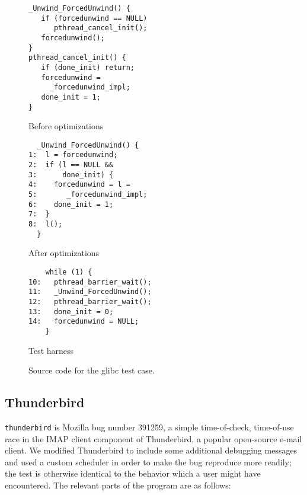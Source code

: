 \begin{figure*}
  \begin{subfloat}
    \begin{minipage}{52mm}
\begin{verbatim}
_Unwind_ForcedUnwind() {
   if (forcedunwind == NULL)
      pthread_cancel_init();
   forcedunwind();
}
pthread_cancel_init() {
   if (done_init) return;
   forcedunwind =
     _forcedunwind_impl;
   done_init = 1;
}
\end{verbatim}
    \end{minipage}
    \caption{Before optimizations}
  \end{subfloat}
  \begin{subfloat}
    \begin{minipage}{52mm}
\begin{verbatim}
  _Unwind_ForcedUnwind() {
1:  l = forcedunwind;
2:  if (l == NULL &&
3:      done_init) {
4:    forcedunwind = l =
5:       _forcedunwind_impl;
6:    done_init = 1;
7:  }
8:  l();
  }
\end{verbatim}
    \end{minipage}
    \caption{After optimizations}
  \end{subfloat}
  \begin{subfloat}
    \begin{minipage}{35mm}
\begin{verbatim}
    while (1) {
10:   pthread_barrier_wait();
11:   _Unwind_ForcedUnwind();
12:   pthread_barrier_wait();
13:   done_init = 0;
14:   forcedunwind = NULL;
    }
\end{verbatim}
    \end{minipage}
    \caption{Test harness}
  \end{subfloat}
  \label{fig:glibc}
  \caption{Source code for the glibc test case.}
\end{figure*}

\subsection{Thunderbird}


\verb|thunderbird| is Mozilla bug number
391259\cite{thunderbird39125}, a simple time-of-check, time-of-use
race in the IMAP client component of Thunderbird, a popular
open-source e-mail client.  We modified Thunderbird to include some
additional debugging messages and used a custom scheduler in order to
make the bug reproduce more readily; the test is otherwise identical
to the behavior which a user might have encountered.  The relevant
parts of the program are as follows:

